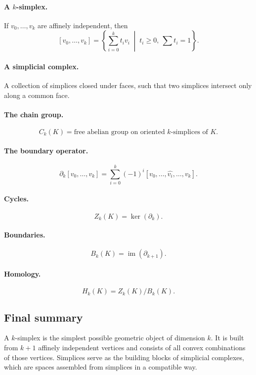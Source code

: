 \documentclass[12pt,a4paper]{article}
\theoremstyle{notespace}
\begin{document}
\paragraph{A \(k\)-simplex.}
If \(v_0,\dots,v_k\) are affinely independent, then
\[
[v_0,\dots,v_k]
=
\left\{
\sum_{i=0}^k t_i v_i
\;\middle|\;
t_i\ge 0,\ \sum t_i=1
\right\}.
\]

\paragraph{A simplicial complex.}
A collection of simplices closed under faces, such that two simplices intersect only along a common face.

\paragraph{The chain group.}
\[
C_k(K)=\text{free abelian group on oriented \(k\)-simplices of \(K\)}.
\]

\paragraph{The boundary operator.}
\[
\partial_k[v_0,\dots,v_k]
=
\sum_{i=0}^k (-1)^i [v_0,\dots,\widehat{v_i},\dots,v_k].
\]

\paragraph{Cycles.}
\[
Z_k(K)=\ker(\partial_k).
\]

\paragraph{Boundaries.}
\[
B_k(K)=\operatorname{im}(\partial_{k+1}).
\]

\paragraph{Homology.}
\[
H_k(K)=Z_k(K)/B_k(K).
\]

\subsection{Final summary}

A \(k\)-simplex is the simplest possible geometric object of dimension \(k\). It is built from \(k+1\) affinely independent vertices and consists of all convex combinations of those vertices. Simplices serve as the building blocks of simplicial complexes, which are spaces assembled from simplices in a compatible way.
\end{document}
